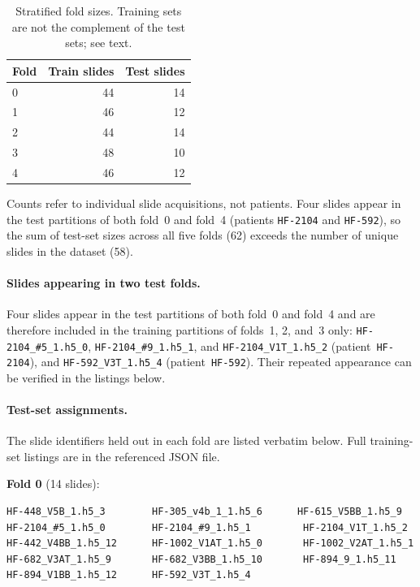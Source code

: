 \begin{table}[htp]
\centering
\small
\caption{Stratified fold sizes. Training sets are not the complement of the test sets; see text.}
\label{tab:cv_folds_summary}
\begin{tabular}{lrr}
\toprule
Fold & Train slides & Test slides \\
\midrule
0 & 44 & 14 \\
1 & 46 & 12 \\
2 & 44 & 14 \\
3 & 48 & 10 \\
4 & 46 & 12 \\
\bottomrule
\end{tabular}
\small{Counts refer to individual slide acquisitions, not patients. Four slides appear in the test partitions of both fold~0 and fold~4 (patients \texttt{HF-2104} and \texttt{HF-592}), so the sum of test-set sizes across all five folds (62) exceeds the number of unique slides in the dataset (58).}
\end{table}

\paragraph{Slides appearing in two test folds.}
Four slides appear in the test partitions of both fold~0 and fold~4 and are therefore included in the training partitions of folds~1, 2, and~3 only: \texttt{HF-2104\_\#5\_1.h5\_0}, \texttt{HF-2104\_\#9\_1.h5\_1}, and \texttt{HF-2104\_V1T\_1.h5\_2} (patient~\texttt{HF-2104}), and \texttt{HF-592\_V3T\_1.h5\_4} (patient~\texttt{HF-592}). Their repeated appearance can be verified in the listings below.

\paragraph{Test-set assignments.} The slide identifiers held out in each fold are listed verbatim below. Full training-set listings are in the referenced JSON file.

\medskip
\noindent\textbf{Fold 0} (14 slides):
\begin{verbatim}
HF-448_V5B_1.h5_3        HF-305_v4b_1_1.h5_6      HF-615_V5BB_1.h5_9
HF-2104_#5_1.h5_0        HF-2104_#9_1.h5_1         HF-2104_V1T_1.h5_2
HF-442_V4BB_1.h5_12      HF-1002_V1AT_1.h5_0       HF-1002_V2AT_1.h5_1
HF-682_V3AT_1.h5_9       HF-682_V3BB_1.h5_10       HF-894_9_1.h5_11
HF-894_V1BB_1.h5_12      HF-592_V3T_1.h5_4
\end{verbatim}

